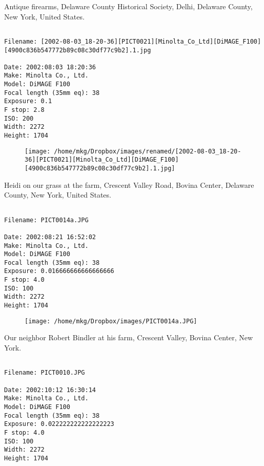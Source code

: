 \clearpage
\onecolumn
\noindent Antique firearms, Delaware County Historical Society, Delhi, Delaware County, New York, United States.
\noindent
\begin{lstlisting}

Filename: [2002-08-03_18-20-36][PICT0021][Minolta_Co_Ltd][DiMAGE_F100][4900c836b547772b89c08c30df77c9b2].1.jpg

Date: 2002:08:03 18:20:36
Make: Minolta Co., Ltd.
Model: DiMAGE F100
Focal length (35mm eq): 38
Exposure: 0.1
F stop: 2.8
ISO: 200
Width: 2272
Height: 1704
\end{lstlisting}
\clearpage

\begin{figure}
\texttt{[image: /home/mkg/Dropbox/images/renamed/[2002-08-03\_18-20-36][PICT0021][Minolta\_Co\_Ltd][DiMAGE\_F100][4900c836b547772b89c08c30df77c9b2].1.jpg]}
\end{figure}
    
\clearpage
\onecolumn
\noindent Heidi on our grass at the farm, Crescent Valley Road, Bovina Center, Delaware County, New York, United States.
\noindent
\begin{lstlisting}

Filename: PICT0014a.JPG

Date: 2002:08:21 16:52:02
Make: Minolta Co., Ltd.
Model: DiMAGE F100
Focal length (35mm eq): 38
Exposure: 0.016666666666666666
F stop: 4.0
ISO: 100
Width: 2272
Height: 1704
\end{lstlisting}
\clearpage

\begin{figure}
\texttt{[image: /home/mkg/Dropbox/images/PICT0014a.JPG]}
\end{figure}
    
\clearpage
\onecolumn
\noindent Our neighbor Robert Bindler at his farm, Crescent Valley, Bovina Center, New York.
\noindent
\begin{lstlisting}

Filename: PICT0010.JPG

Date: 2002:10:12 16:30:14
Make: Minolta Co., Ltd.
Model: DiMAGE F100
Focal length (35mm eq): 38
Exposure: 0.022222222222222223
F stop: 4.0
ISO: 100
Width: 2272
Height: 1704
\end{lstlisting}
\clearpage

